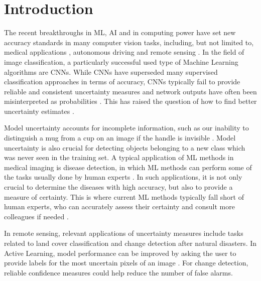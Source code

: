 \documentclass[10pt]{article}
\begin{document}
\setcounter{page}{1}

\section{Introduction}
The recent breakthroughs in \gls{ML}, \gls{AI} and in computing power have set new accuracy standards in many computer vision tasks, including, but not limited to, medical applications \cite{leibig2017, ronneberger2015u}, autonomous driving \cite{Levinson2011TowardsFA} and remote sensing \cite{Volpi2017DenseSL, kampffmeyer, Zhu2017DeepLI, Shelhamer2015FullyCN}. In the field of image classification, a particularly successful used type of Machine Learning algorithms are \glspl{CNN}. While \glspl{CNN} have superseded many supervised classification approaches in terms of accuracy, \glspl{CNN} typically fail to provide reliable and consistent uncertainty measures and network outputs have often been misinterpreted as probabilities \cite{NguyenYC14, Goodfellow2014}. This has raised the question of how to find better uncertainty estimates \cite{KendallG17, Gal2016Uncertainty}.

Model uncertainty accounts for incomplete information, such as our inability to distinguish a mug from a cup on an image if the handle is invisible \cite{Rupprecht2017LearningIA}. Model uncertainty is also crucial for detecting objects belonging to a new class which was never seen in the training set. A typical application of \gls{ML} methods in medical imaging is disease detection, in which \gls{ML} methods can perform some of the tasks usually done by human experts \cite{leibig2017}. In such applications, it is not only crucial to determine the diseases with high accuracy, but also to provide a measure of certainty. This is where current \gls{ML} methods typically fall short of human experts, who can accurately assess their certainty and consult more colleagues if needed \cite{leibig2017}.

In remote sensing, relevant applications of uncertainty measures include tasks related to land cover classification and change detection after natural disasters. In Active Learning, model performance can be improved by asking the user to provide labels for the most uncertain pixels of an image \cite{menderes_automatic_2015, womble_automated_2007, postadjian_investigating_2017, tuiaAL2011, Tuia2011ASO}. For change detection, reliable confidence measures could help reduce the number of false alarms.
\end{document}
